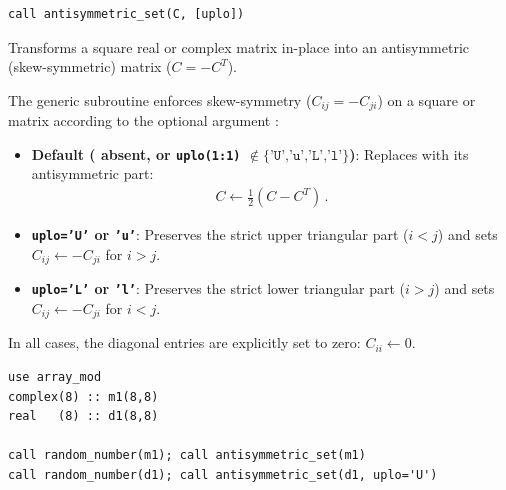 \lstset{language=[95]Fortran}
\begin{lstlisting}
call antisymmetric_set(C, [uplo])
\end{lstlisting}

Transforms a square real or complex matrix  in-place into an antisymmetric (skew-symmetric) matrix ($C = -C^T$).

The generic subroutine  enforces skew-symmetry ($C_{ij} = -C_{ji}$) on a square  or  matrix  according to the optional argument :
\begin{itemize}
  \item \textbf{Default ( absent, or \texttt{uplo(1:1)} $\notin \{\texttt{'U','u','L','l'}\}$)}: Replaces  with its antisymmetric part:
  \begin{align}
    C \leftarrow \frac{1}{2}\left(C - C^T\right)\, .
  \end{align}
  \item \textbf{\texttt{uplo='U'} or \texttt{'u'}}: Preserves the strict upper triangular part ($i < j$) and sets $C_{ij} \leftarrow -C_{ji}$ for $i > j$.
  \item \textbf{\texttt{uplo='L'} or \texttt{'l'}}: Preserves the strict lower triangular part ($i > j$) and sets $C_{ij} \leftarrow -C_{ji}$ for $i < j$.
\end{itemize}
In all cases, the diagonal entries are explicitly set to zero: $C_{ii} \leftarrow 0$.

\begin{description}[leftmargin=2.2cm, style=nextline]
\end{description}

\lstset{language=[95]Fortran}
\begin{lstlisting}
use array_mod
complex(8) :: m1(8,8)
real   (8) :: d1(8,8)

call random_number(m1); call antisymmetric_set(m1)
call random_number(d1); call antisymmetric_set(d1, uplo='U')
\end{lstlisting}


